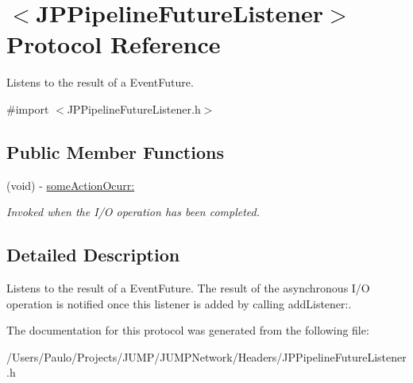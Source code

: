 \hypertarget{a00028}{
\section{$<$JPPipelineFutureListener$>$ Protocol Reference}
\label{a00028}
}


Listens to the result of a EventFuture.  




{\ttfamily \#import $<$JPPipelineFutureListener.h$>$}

\subsection*{Public Member Functions}
\begin{DoxyCompactItemize}
\item 
\hypertarget{a00028_a325c80e9415785f3737a6b992f2e8f1a}{
(void) -\/ \hyperlink{a00028_a325c80e9415785f3737a6b992f2e8f1a}{someActionOcurr:}}
\label{a00028_a325c80e9415785f3737a6b992f2e8f1a}

\begin{DoxyCompactList}\small\item\em Invoked when the I/O operation has been completed. \item\end{DoxyCompactList}\end{DoxyCompactItemize}


\subsection{Detailed Description}
Listens to the result of a EventFuture. The result of the asynchronous I/O operation is notified once this listener is added by calling addListener:. 

The documentation for this protocol was generated from the following file:\begin{DoxyCompactItemize}
\item 
/Users/Paulo/Projects/JUMP/JUMPNetwork/Headers/JPPipelineFutureListener.h\end{DoxyCompactItemize}
